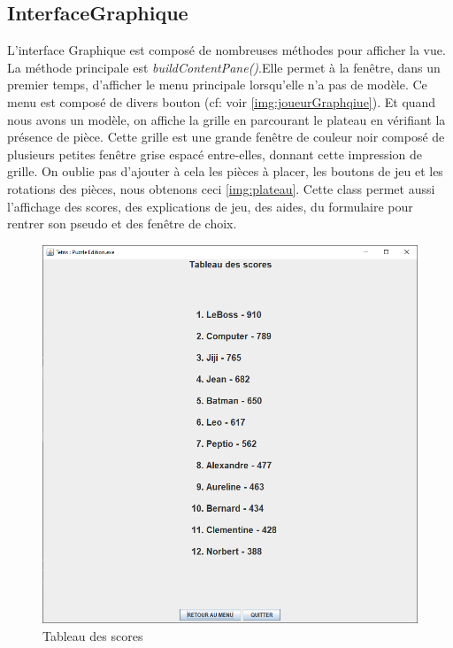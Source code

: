 		\subsection{InterfaceGraphique}
		L'interface Graphique est composé de nombreuses méthodes pour afficher la vue. La méthode principale est \textit{buildContentPane()}.Elle permet à la fenêtre, dans un premier temps, d'afficher le menu principale lorsqu'elle n'a pas de modèle. Ce menu est composé de divers bouton (cf: voir \ref{img:joueurGraphqiue}). Et quand nous avons un modèle, on affiche la grille en parcourant le plateau en vérifiant la présence de pièce. Cette grille est une grande fenêtre de couleur noir composé de plusieurs petites fenêtre grise espacé entre-elles, donnant cette impression de grille. On oublie pas d'ajouter à cela les pièces à placer, les boutons de jeu et les rotations des pièces, nous obtenons ceci \ref{img:plateau}. Cette class permet aussi l'affichage des scores, des explications de jeu, des aides, du formulaire pour rentrer son pseudo et des fenêtre de choix.

        \begin{figure}[H]
            \centering
            \includegraphics[scale=0.5]{img/score.png}
            \caption{Tableau des scores}
        \end{figure}

